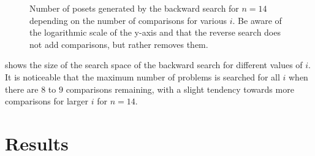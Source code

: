 \documentclass[twoside,leqno,twocolumn]{article}
\begin{document}
\begin{figure}[!b]
  \centering
  
  \caption{Number of posets generated by the backward search for $n = 14$ depending on the number of comparisons for various $i$.
    Be aware of the logarithmic scale of the y-axis and that the reverse search does not add comparisons, but rather removes them.}
  \label{fig:backward-posets-per-level}
\end{figure}

 shows the size of the search space of the backward search for different values of $i$.
It is noticeable that the maximum number of problems is searched for all $i$ when there are $8$ to $9$ comparisons remaining, with a slight tendency towards more comparisons for larger $i$ for $n = 14$.

\section{Results}
\end{document}
